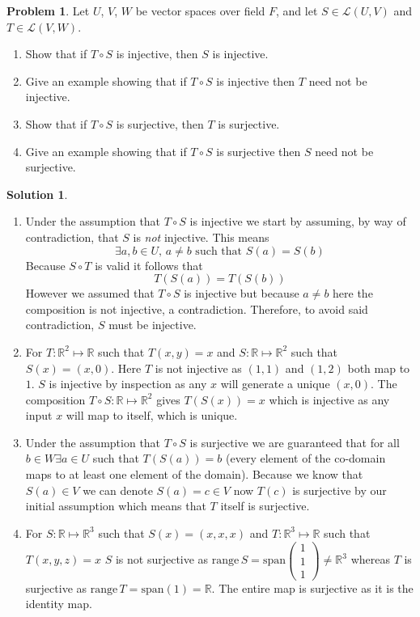 \documentclass[10pt]{article}
\theoremstyle{definition}
\newtheorem{problem}{Problem}
\newtheorem{soln}{Solution}
\begin{document}
\begin{problem}
Let $U$, $V$, $W$ be vector spaces over field $F$, and let $S\in\mathcal{L}(U,V)$ and $T\in\mathcal{L}(V,W)$.
\begin{enumerate}[label=(\alph*)]
  \item Show that if $T\circ S$ is injective, then $S$ is injective.
  \item Give an example showing that if $T\circ S$ is injective then $T$ need not be injective.
  \item Show that if $T\circ S$ is surjective, then $T$ is surjective.
  \item Give an example showing that if $T\circ S$ is surjective then $S$ need not be surjective.
\end{enumerate}
\end{problem}
\begin{soln}~
  \begin{enumerate}[label=(\alph*)]
    \item Under the assumption that $T\circ S$ is injective we start by assuming, by way of contradiction, that
          $S$ is \textit{not} injective. This means
          $$\exists a,b\in U,\, a\neq b \text{ such that } S(a)=S(b)$$
          Because $S\circ T$ is valid it follows that
          $$T(S(a))=T(S(b))$$
          However we assumed that $T\circ S$ is injective but because $a\neq b$ here the composition is not injective, a contradiction.
          Therefore, to avoid said contradiction, $S$ must be injective.
    \item For $T:\mathbb{R}^2\mapsto \mathbb{R}$ such that $T(x,y)=x$ and $S:\mathbb{R}\mapsto\mathbb{R}^2$ such that $S(x)=(x,0)$.
          Here $T$ is not injective as $(1,1)$ and $(1,2)$ both map to $1$. $S$ is injective by inspection as any $x$ will generate a unique
          $(x,0)$. The composition $T\circ S: \mathbb{R}\mapsto \mathbb{R}^2$ gives $T(S(x))=x$ which is injective as any input $x$ will map to itself, which is unique.
    \item Under the assumption that $T\circ S$ is surjective we are guaranteed that for all
          $b\in W\exists a\in U$ such that $T(S(a))=b$ (every element of the co-domain maps to at least one element of the domain).
          Because we know that $S(a)\in V$ we can denote $S(a)=c\in V$ now $T(c)$ is surjective by our initial assumption which means
          that $T$ itself is surjective.
    \item For $S:\mathbb{R}\mapsto\mathbb{R}^3$ such that $S(x)=(x,x,x)$ and $T:\mathbb{R}^3\mapsto \mathbb{R}$ such that $T(x,y,z)=x$ $S$ is not surjective as
          $\mathrm{range}\,S=\mathrm{span}\begin{pmatrix}
              1 \\
              1 \\
              1
            \end{pmatrix} \neq \mathbb{R}^3$ whereas $T$ is surjective as $\mathrm{range}\,T=\mathrm{span}(1)=\mathbb{R}$. The entire map is surjective as it is the identity map.
  \end{enumerate}
\end{soln}
\newpage
\end{document}

